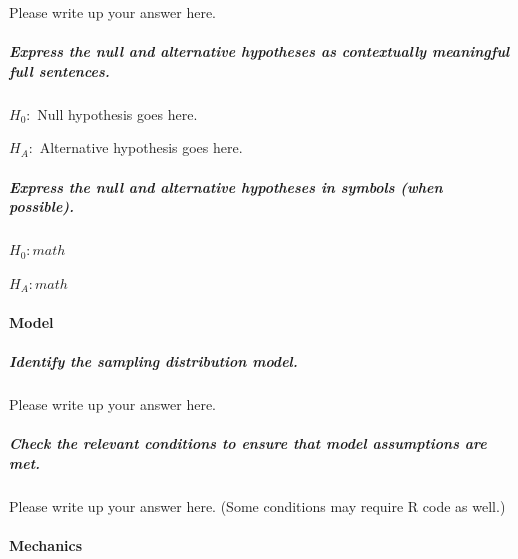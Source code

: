 \documentclass[
]{book}
\begin{document}
Please write up your answer here.

\hypertarget{express-the-null-and-alternative-hypotheses-as-contextually-meaningful-full-sentences.}{%
\subparagraph*{Express the null and alternative hypotheses as contextually meaningful full sentences.}\label{express-the-null-and-alternative-hypotheses-as-contextually-meaningful-full-sentences.}}

\(H_{0}:\) Null hypothesis goes here.

\(H_{A}:\) Alternative hypothesis goes here.

\hypertarget{express-the-null-and-alternative-hypotheses-in-symbols-when-possible.}{%
\subparagraph*{Express the null and alternative hypotheses in symbols (when possible).}\label{express-the-null-and-alternative-hypotheses-in-symbols-when-possible.}}

\(H_{0}: math\)

\(H_{A}: math\)

\hypertarget{model}{%
\paragraph*{Model}\label{model}}

\hypertarget{identify-the-sampling-distribution-model.}{%
\subparagraph*{Identify the sampling distribution model.}\label{identify-the-sampling-distribution-model.}}

Please write up your answer here.

\hypertarget{check-the-relevant-conditions-to-ensure-that-model-assumptions-are-met.}{%
\subparagraph*{Check the relevant conditions to ensure that model assumptions are met.}\label{check-the-relevant-conditions-to-ensure-that-model-assumptions-are-met.}}

Please write up your answer here. (Some conditions may require R code as well.)

\hypertarget{mechanics}{%
\paragraph*{Mechanics}\label{mechanics}}
\end{document}
